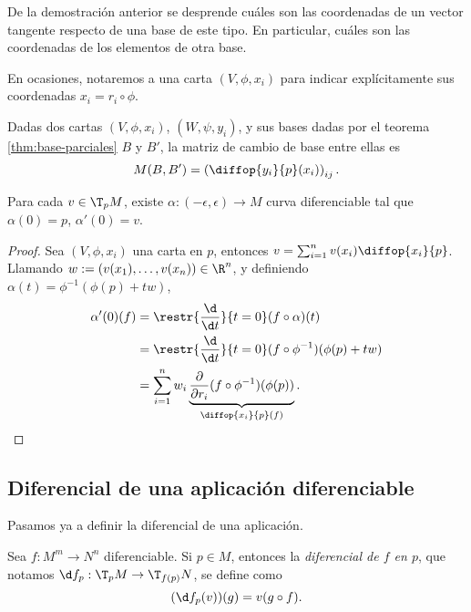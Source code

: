 De la demostración anterior se desprende cuáles son las coordenadas de un vector
tangente respecto de una base de este tipo. En particular, cuáles son las
coordenadas de los elementos de otra base.
\begin{notacion}
  En ocasiones, notaremos a una carta $(V,\phi,x_{i})$ para indicar
  explícitamente sus coordenadas $x_{i} = r_{i}\circ \phi$.
\end{notacion}
\begin{nprop}
  Dadas dos cartas $(V, \phi, x_{i})$, $(W,\psi,y_{i})$, y sus bases dadas por
  el teorema \ref{thm:base-parciales} $B$ y $B'$, la matriz de cambio de base
  entre ellas es
  \[
    M(B,B') = \left( \diffop{y_{i}}{p}(x_{i}) \right)_{ij}
  .\]
\end{nprop}

\begin{nprop}
  Para cada $v\in \T_{p}M$, existe $\alpha: (-\epsilon,\epsilon)\to M$ curva
  diferenciable tal que $\alpha(0)=p$, $\alpha'(0)=v$.
\end{nprop}
\begin{proof}
  Sea $(V,\phi,x_{i})$ una carta en $p$, entonces $v = \sum_{i=1}^{n} v(x_{i})
  \diffop{x_{i}}{p}$. Llamando $w := (v(x_{1}), \dots, v(x_{n}))\in
  \R^{n}$, y definiendo $\alpha(t) = \phi^{-1}(\phi(p)+tw)$,
  \begin{align*}
    \alpha'(0)(f) & = \restr{\frac{\d}{\d t}}{t = 0}(f\circ \alpha)(t) \\
    & = \restr{\frac{\d}{\d t}}{t = 0}(f\circ \phi^{-1})(\phi(p)+tw) \\
    & = \sum_{i=1}^{n} w_{i} \underbrace{\frac{\partial}{\partial r_{i}}(f\circ\phi^{-1})(\phi(p))}_{\diffop{x_{i}}{p}(f)}.
  \end{align*}
\end{proof}

\subsection{Diferencial de una aplicación diferenciable}

Pasamos ya a definir la diferencial de una aplicación.
\begin{ndef}
  Sea $f:M^{m}\to N^{n}$ diferenciable. Si $p\in M$, entonces la \emph{diferencial de
  $f$ en $p$}, que notamos $\d f_{p}: \T_{p}M\to \T_{f(p)}N$, se define como
  \[
    (\d f_{p}(v))(g) = v(g\circ f) .\]
\end{ndef}

